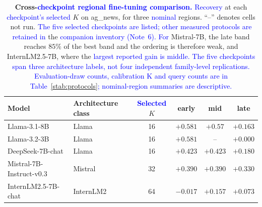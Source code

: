 \documentclass[11pt]{article}
\begin{document}
\begin{table}[h]
\centering
\caption{\textbf{Cross-\textcolor{blue}{checkpoint regional fine-tuning comparison.}} \textcolor{blue}{Recovery} at each
\textcolor{blue}{checkpoint's selected} $K$ on ag\_news, for three \textcolor{blue}{nominal} regions.
``--'' denotes cells not run. \textcolor{blue}{The five selected checkpoints are listed; other measured
protocols are retained in} the \textcolor{blue}{companion inventory (Note}~\textcolor{blue}{6). For} Mistral-7B, the late band
reaches $85\%$ of the best band and the
ordering is therefore weak, and InternLM2.5-7B, where the \textcolor{blue}{largest reported gain is middle.
The five checkpoints span three architecture labels, not four independent family-level
replications. Evaluation-draw counts, calibration K and query counts are in
Table}~\textcolor{blue}{\ref{stab:protocols}}\textcolor{blue}{; nominal-region summaries are descriptive.}}
\label{stab:crossfamily}
\footnotesize
\begin{tabular}{llcccc}
\toprule
Model & Architecture class & \textcolor{blue}{Selected} $K$ & early & mid & late \\
\midrule
Llama-3.1-8B            & Llama     & 16 & $+0.581$ & $+0.57$  & $+0.163$ \\
Llama-3.2-3B            & Llama     & 16 & $+0.581$ & --       & $+0.000$ \\
DeepSeek-7B-chat        & Llama     & 16 & $+0.423$ & $+0.423$ & $+0.180$ \\
Mistral-7B-Instruct-v0.3& Mistral   & 32 & $+0.390$ & $+0.390$ & $+0.330$ \\
InternLM2.5-7B-chat     & InternLM2 & 64 & $-0.017$ & $+0.157$ & $+0.073$ \\
\bottomrule
\end{tabular}
\end{table}
\end{document}
